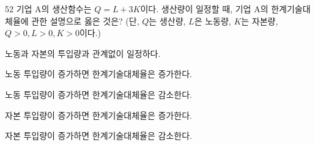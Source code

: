 \begin{question}{52}
기업 A의 생산함수는 ${ Q=L+3K }$이다. 생산량이 일정할 때, 기업 A의 한계기술대체율에 관한 설명으로 옳은 것은? (단, ${ Q }$는 생산량, ${ L }$은 노동량, ${ K }$는 자본량, ${ Q>0, L>0, K>0 }$이다.)
\begin{choices}
  \item 노동과 자본의 투입량과 관계없이 일정하다.
  \item 노동 투입량이 증가하면 한계기술대체율은 증가한다.
  \item 노동 투입량이 증가하면 한계기술대체율은 감소한다.
  \item 자본 투입량이 증가하면 한계기술대체율은 증가한다.
  \item 자본 투입량이 증가하면 한계기술대체율은 감소한다.
\end{choices}
\end{question}
